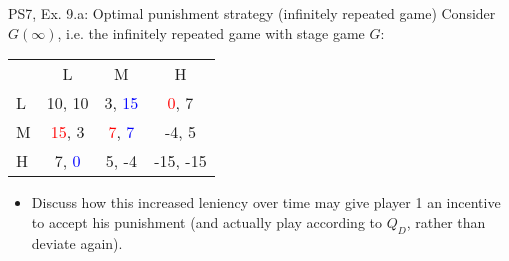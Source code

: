 \begin{frame}{PS7, Ex. 9.a: Optimal punishment strategy (infinitely repeated game)}
    Consider $G(\infty)$, i.e. the infinitely repeated game with stage game $G$: \vspace{-6pt}
    \begin{table}
      \begin{tabular}{l|c|c|c|}
        \multicolumn{1}{c}{} & \multicolumn{1}{c}{L} & \multicolumn{1}{c}{M} & \multicolumn{1}{c}{H} \\\cline{2-4}
        L & 10, 10 & 3, \textcolor{blue}{15} & \textcolor{red}{0}, 7 \\\cline{2-4}
        M & \textcolor{red}{15}, 3 & \textcolor{red}{7}, \textcolor{blue}{7} & -4, 5 \\\cline{2-4}
        H & 7, \textcolor{blue}{0} & 5, -4 & -15, -15 \\\cline{2-4}
      \end{tabular}
    \end{table}
    \vspace{-4pt}
    \begin{itemize}
      \item[(a)] Discuss how this increased leniency over time may give player 1 an incentive to accept his punishment (and actually play according to $Q_D$, rather than deviate again).
    \end{itemize}
    \vfill\null
\end{frame}
